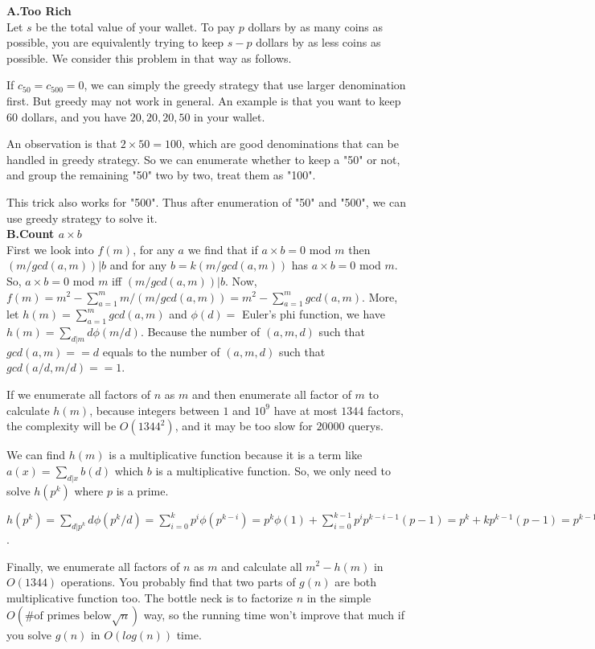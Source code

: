 \documentclass[14pt,a4paper]{article}
\begin{document}
{\Large \bf A.Too Rich} \\

Let $s$ be the total value of your wallet.
To pay $p$ dollars by as many coins as possible,
you are equivalently trying to keep $s - p$ dollars by as less coins as possible.
We consider this problem in that way as follows.

If $c_{50} = c_{500} = 0$, we can simply the greedy strategy that use larger denomination first.
But greedy may not work in general.
An example is that you want to keep 60 dollars, and you have $20, 20, 20, 50$ in your wallet.

An observation is that $2 \times 50 = 100$,
which are good denominations that can be handled in greedy strategy.
So we can enumerate whether to keep a "50" or not,
and group the remaining "50" two by two, treat them as "100".

This trick also works for "500".
Thus after enumeration of "50" and "500", we can use greedy strategy to solve it.
\\

{\Large \bf B.Count $a \times b$}\\

First we look into $f(m)$, for any $a$ we find that if $a\times b = 0$ mod $m$ then $(m/gcd(a,m))|b$ and for any $b=k(m/gcd(a,m))$ has $a\times b = 0$ mod $m$. 
So, $a\times b = 0$ mod $m$ iff $(m/gcd(a,m))|b$. Now, $f(m)=m^2-\sum\limits_{a=1}^{m}m/(m/gcd(a,m))=m^2-\sum\limits_{a=1}^{m}gcd(a,m)$. 
More, let $h(m)=\sum\limits_{a=1}^{m}gcd(a,m)$ and $\phi(d)=$ Euler's phi function, we have $h(m)=\sum\limits_{d|m}d\phi(m/d)$. 
Because the number of $(a,m,d)$ such that $gcd(a,m)==d$ equals to the number of $(a,m,d)$ such that $gcd(a/d,m/d)==1$. 

If we enumerate all factors of $n$ as $m$ and then enumerate all factor of $m$ to calculate $h(m)$, 
because integers between $1$ and $10^9$ have at most $1344$ factors, 
the complexity will be $O(1344^2)$, and it may be too slow for $20000$ querys.

We can find $h(m)$ is a multiplicative function because it is a term like $a(x)=\sum_{d|x}b(d)$ which $b$ is a multiplicative function.
So, we only need to solve $h(p^k)$ where $p$ is a prime.

$h(p^k)=\sum\limits_{d|p^k}d\phi(p^k/d)=\sum\limits_{i=0}^{k}p^i\phi(p^{k-i})=p^k\phi(1)+\sum\limits_{i=0}^{k-1}p^ip^{k-i-1}(p-1)=p^k+kp^{k-1}(p-1)=p^{k-1}(k(p-1)+p)$.

Finally, we enumerate all factors of $n$ as $m$ and calculate all $m^2-h(m)$ in $O(1344)$ operations. 
You probably find that two parts of $g(n)$ are both multiplicative function too. The bottle neck is to factorize $n$ in the simple $O(\text{\# of primes below}\sqrt{n})$ way, 
so the running time won't improve that much if you solve $g(n)$ in $O(log(n))$ time.
\\
\end{document}
